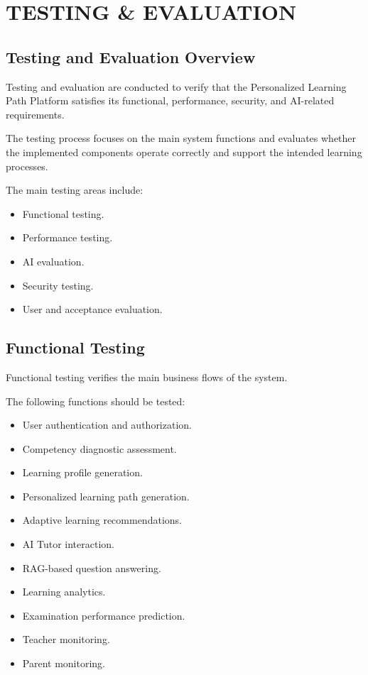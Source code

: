 \chapter{TESTING \& EVALUATION}

\section{Testing and Evaluation Overview}

Testing and evaluation are conducted to verify that the Personalized Learning Path Platform satisfies its functional, performance, security, and AI-related requirements.

The testing process focuses on the main system functions and evaluates whether the implemented components operate correctly and support the intended learning processes.

The main testing areas include:

\begin{itemize}
	\item Functional testing.
	\item Performance testing.
	\item AI evaluation.
	\item Security testing.
	\item User and acceptance evaluation.
\end{itemize}

\section{Functional Testing}

Functional testing verifies the main business flows of the system.

The following functions should be tested:

\begin{itemize}
	\item User authentication and authorization.
	\item Competency diagnostic assessment.
	\item Learning profile generation.
	\item Personalized learning path generation.
	\item Adaptive learning recommendations.
	\item AI Tutor interaction.
	\item RAG-based question answering.
	\item Learning analytics.
	\item Examination performance prediction.
	\item Teacher monitoring.
	\item Parent monitoring.
\end{itemize}

